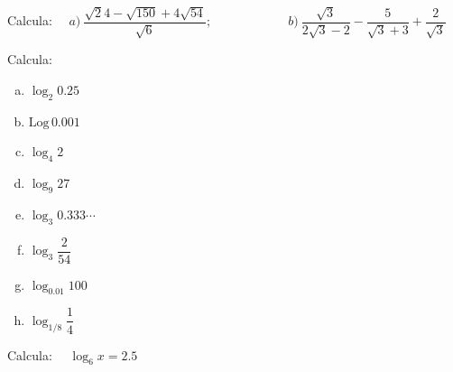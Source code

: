 \begin{mipropuesto}
	
	Calcula:	
$\quad a)\ \dfrac{\sqrt
24-\sqrt{150}+4\sqrt{54}}{\sqrt{6}};\qquad \qquad \qquad b)\ \dfrac{\sqrt{3}}{2\sqrt{3}-2}-\dfrac{5}{\sqrt{3}+3}+\dfrac{2}{\sqrt
{3}}$
\end{mipropuesto}

\vspace{-8mm}
\begin{flushright}
\begin{footnotesize} \textcolor{gris}{}	\end{footnotesize}
\end{flushright}


\begin{mipropuesto}
	
	Calcula:
\begin{multicols}{2}	
\begin{enumerate}[a) ]
	\item $\log_2 0.25$
	\item $\mathrm{Log}\, 0.001$
	\item $\log_4 2$
	\item $\log_9 27$
	\item $\log_3 0.333\cdots$
	\item $\log_3 \dfrac{2}{54}$
	\item $\log_{0.01}100$
	\item $\log_{1/8} \dfrac 1 4$
\end{enumerate}
\end{multicols}	
\vspace{1mm}
\end{mipropuesto}

\vspace{-8mm}
\begin{flushright}
\begin{footnotesize} \textcolor{gris}{}	\end{footnotesize}
\end{flushright}

\begin{mipropuesto}

Calcula: $\quad \log_6 x=2.5$	
\end{mipropuesto}

\vspace{-8mm}
\begin{flushright}
\begin{footnotesize} \textcolor{gris}{}	\end{footnotesize}
\end{flushright}

